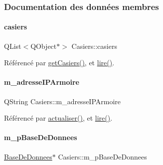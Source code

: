 \subsubsection{Documentation des données membres}
\mbox{\label{class_casiers_ad8fba25144a82ba49b2cd2490dcf975b}} 
\paragraph{\texorpdfstring{casiers}{casiers}}
{\footnotesize\ttfamily Q\+List$<$Q\+Object$\ast$$>$ Casiers\+::casiers\hspace{0.3cm}{\ttfamily [private]}}



Référencé par \hyperlink{class_casiers_a3c23157572d06e973860c4d9f9589b1e}{get\+Casiers()}, et \hyperlink{class_casiers_a7b1d58f40217ef13a5dd0d966df38c9a}{lire()}.

\mbox{\label{class_casiers_af745ce1cdce8dce725444e19437e0155}} 
\paragraph{\texorpdfstring{m\+\_\+adresse\+I\+P\+Armoire}{m\_adresseIPArmoire}}
{\footnotesize\ttfamily Q\+String Casiers\+::m\+\_\+adresse\+I\+P\+Armoire\hspace{0.3cm}{\ttfamily [private]}}



Référencé par \hyperlink{class_casiers_a53ff5feefb50f5010943c94916be060f}{actualiser()}, et \hyperlink{class_casiers_a7b1d58f40217ef13a5dd0d966df38c9a}{lire()}.

\mbox{\label{class_casiers_ae6ac6b09a5cffe28291fc9b3289ff011}} 
\paragraph{\texorpdfstring{m\+\_\+p\+Base\+De\+Donnees}{m\_pBaseDeDonnees}}
{\footnotesize\ttfamily \hyperlink{class_base_de_donnees}{Base\+De\+Donnees}$\ast$ Casiers\+::m\+\_\+p\+Base\+De\+Donnees\hspace{0.3cm}{\ttfamily [private]}}



